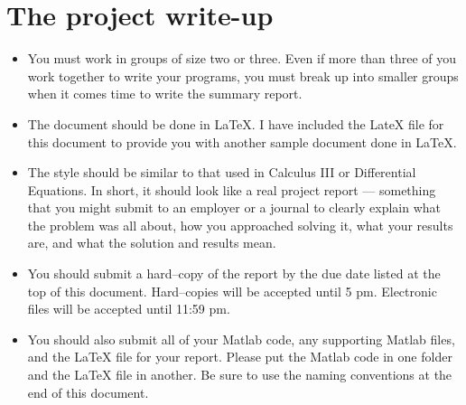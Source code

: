 \documentclass[11pt]{article}
\begin{document}
\section{The project write-up}
\begin{itemize}

\item You must work in groups of size two or three.
Even if more than three of you work together to write
your programs, you must break up into smaller groups
when it comes time to write the summary report.

\item The document should be done in LaTeX. I have included the
LateX file for this document to provide you with another sample
document done in LaTeX.

\item The style should be similar to that used in Calculus III
or Differential Equations. In short, it should look like a real
project report --- something that you might submit to an employer
or a journal to clearly explain what the problem was all about,
how you approached solving it, what your results are, and what
the solution and results mean.

\item You should submit a hard--copy of the report by the due
date listed at the top of this document. Hard--copies will
be accepted until 5 pm. Electronic files will be accepted
until 11:59 pm.

\item You should also submit all of your Matlab code, any
supporting Matlab files, and the LaTeX file for your report.
Please put the Matlab code in one folder and the LaTeX file in
another. Be sure to use the naming conventions at the end of
this document.

\end{itemize}




\vfill
\end{document}
